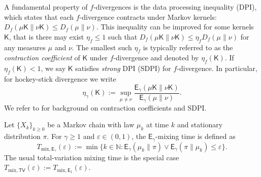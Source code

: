 \documentclass[10pt, journal]{IEEEtran}
\newcommand{\sE}{\mathsf{E}}
\newcommand{\sK}{\mathsf{K}}
\begin{document}
A fundamental property of $f$-divergences is the data processing inequality (DPI), which states that each $f$-divergence contracts under Markov kernels: $D_f(\mu\sK\|\nu\sK)\le D_f(\mu\|\nu).$ This inequality can be improved for some kernels $\sK$, that is there may exist $\eta_f \leq 1$ such that $D_f(\mu\sK \| \nu\sK) \leq \eta_f D_f(\mu \| \nu)$ for any measures $\mu$ and $\nu$. The smallest such $\eta_f$ is typically referred to as the \textit{contraction coefficient} of $\sK$ under $f$-divergence and denoted by $\eta_f(\sK)$. If $\eta_f(\sK)<1$, we say $\sK$ satisfies \textit{strong} DPI (SDPI) for $f$-divergence.  In particular, for hockey-stick divergence we write 
\begin{equation}\label{eq:SDPI_gamma}
    \eta_\gamma(\sK):=\sup_{\mu\ne\nu}\frac{\mathsf E_\gamma(\mu\sK\|\nu\sK)}{\mathsf E_\gamma(\mu\|\nu)}.
\end{equation}
We refer to \cite{asoodeh2020contraction,asoodeh2023privacy,Makur_SDPI,raginsky2016strong} for background on contraction coefficients and SDPI. 

Let $\{X_k\}_{k\ge0}$ be a Markov chain with law $\mu_k$ at time $k$ and stationary distribution $\pi$. For $\gamma\ge1$ and $\varepsilon\in(0,1)$, the $\mathsf E_\gamma$-mixing time \cite{Zamanlooy2024} is defined as  $$T_{\mathrm{mix},\mathsf E_\gamma}(\varepsilon):=\min\{k\in\mathbb N:\mathsf E_\gamma(\mu_k\|\pi)\vee \sE_\gamma(\pi\|\mu_k) \le\varepsilon\}.$$ The usual total-variation mixing time is the special case $T_{\mathrm{mix},\mathsf{TV}}(\varepsilon):=T_{\mathrm{mix},\mathsf E_1}(\varepsilon)$.

\SetAlgoNoLine
\LinesNotNumbered

\begin{algorithm}[t]
\caption{Independent Metropolis--Hastings with proposal $q$}
\label{algo:imh}

\end{algorithm}
\end{document}
